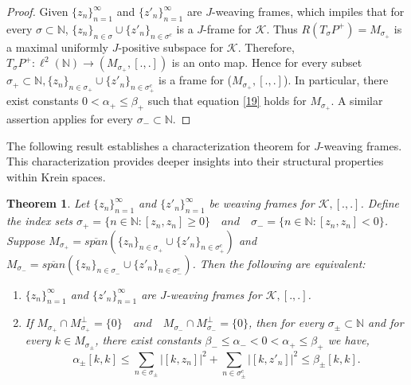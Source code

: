 \documentclass[article,12pt]{amsart}
\newtheorem{thm}{Theorem}[section]
\newtheorem{ex}[thm]{Example}
\begin{document}




\begin{proof}
Given $\{z_n\}^\infty_{n= 1}$ and $\{z'_n\}^\infty_{n= 1}$ are $J$-weaving frames, which impiles that for every $ \sigma \subset{\mathbb{N}}$, 
$\{z_n\}_{n \in \sigma} \cup \{z'_n\}_{n \in \sigma^c}$ is a $J$-frame for $\mathcal{K}$.
Thus $R(T_{\sigma}P^+) = M_{\sigma_+}$ is a maximal uniformly $J$-positive subspace for $\mathcal{K}$. Therefore, $T_{\sigma}P^+: \ell^2(\mathbb N)\rightarrow (M_{\sigma_+}, [., .])$ is an onto map. Hence for every subset $\sigma_+ \subset \mathbb{N},  \{z_n\}_{n \in \sigma_+} \cup \{z'_n\}_{n \in \sigma_+^c}$ is a frame for ($M_{\sigma_+}, [., .]$). In particular, there exist constants $0<\alpha_+ \leq \beta_{+}$ such that equation \ref{19} holds for $M_{\sigma_+}$. A similar assertion applies
for every $\sigma_- \subset \mathbb{N}.$
\end{proof}

The following result establishes a characterization theorem for $J$-weaving frames. This characterization provides deeper insights into their structural properties within Krein spaces.

\begin{thm}\label{2.20}
	Let $\{z_n\}^\infty_{n= 1}$ and $\{z'_n\}^\infty_{n= 1}$ be weaving frames for $\mathcal{K}, [., .]$. Define the index sets $\sigma_+ =\{n \in\mathbb{N} : [z_n, z_n]\geq0\}\quad and\quad \sigma_- =\{n \in\mathbb{N} : [z_n, z_n]< 0\}$. Suppose $M_{\sigma_+}  = \overline{span} (\{z_n\}_{n \in \sigma_+} \cup \{z'_n\}_{n \in \sigma^c_+})$ and  $M_{\sigma_-}  = \overline{span} (\{z_n\}_{n \in \sigma_-} \cup \{z'_n\}_{n \in \sigma^c_-})$. Then the following are equivalent:
	\begin{enumerate}
	\item $\{z_n\}^\infty_{n= 1}$ and $\{z'_n\}^\infty_{n= 1}$ are $J$-weaving frames for $\mathcal{K}, [., .]$.
	
\item If $M_{\sigma_+} \cap M^\perp_{\sigma_+} = \{0\}\quad and\quad M_{\sigma_-} \cap M^\perp_{\sigma_-} = \{0\} $, then for every $ \sigma_{\pm} \subset \mathbb{N}$ and for every $k \in M_{\sigma_{\pm}}$, there exist constants $ \beta_{-} \leq  \alpha_- < 0 < \alpha_+ \leq \beta_{+}$ we have,
	\begin{equation}	\alpha_{\pm} [k, k]  \leq \sum\limits_{n \in \sigma_{\pm}} |[k, z_n]|^2 + \sum\limits_{n \in \sigma_{\pm}^c} |[k, z'_n]|^2 \leq \beta_{\pm} [k, k].\end{equation}
	\end{enumerate}
	
\end{thm}
\end{document}
